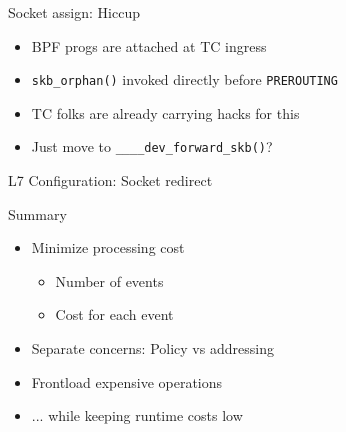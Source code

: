 \documentclass[black,white]{beamer}
\DeclareRobustCommand{\#}{\adjustbox{valign=B,totalheight=.57\baselineskip}{\oldhash}}%
\begin{document}
    \begin{frame}[fragile]{Socket assign: Hiccup}
        \centering
        \begin{itemize}
            \item BPF progs are attached at TC ingress \medskip
            \item \verb+skb_orphan()+ invoked directly before \verb+PREROUTING+ \medskip
            \pause
            \item TC folks are already carrying hacks for this\footnotemark \medskip
            \pause
            \item Just move to \verb+____dev_forward_skb()+\footnotemark? \medskip
        \end{itemize}
    \end{frame}

    \begin{frame}{L7 Configuration: Socket redirect}
        
    \end{frame}

    \begin{frame}{Summary}
        \begin{itemize}
            \item Minimize processing cost \smallskip
            \begin{itemize}
                \item Number of events \medskip
                \item Cost for each event \medskip
            \end{itemize}
            \item Separate concerns: Policy vs addressing \medskip
            \item Frontload expensive operations \medskip
            \item ... while keeping runtime costs low \medskip
        \end{itemize}
    \end{frame}
\end{document}
